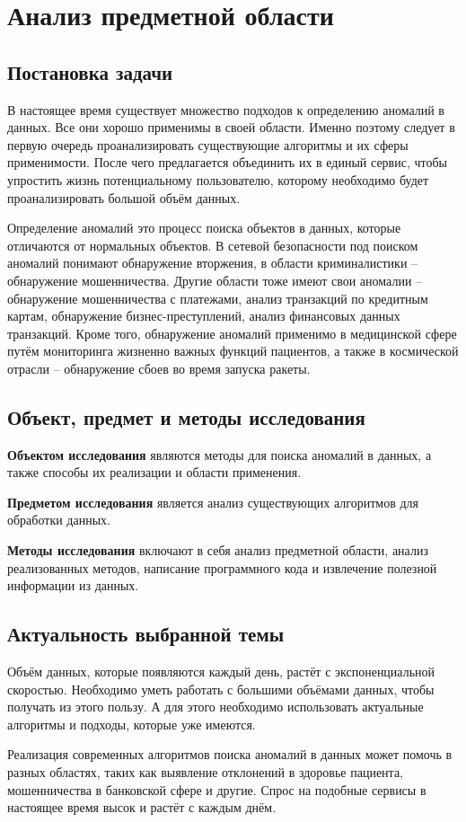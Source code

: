 \chapter{Анализ предметной области} \label{ch:ch1}

\section{Постановка задачи} \label{sec:ch1/sec1}

В настоящее время существует множество подходов к определению аномалий в данных. Все они хорошо применимы в своей области. Именно поэтому следует в первую очередь проанализировать существующие алгоритмы и их сферы применимости. После чего предлагается объединить их в единый сервис, чтобы упростить жизнь потенциальному пользователю, которому необходимо будет проанализировать большой объём данных.

Определение аномалий это процесс поиска объектов в данных, которые отличаются от нормальных объектов. В сетевой безопасности под поиском аномалий понимают обнаружение вторжения, в области криминалистики -- обнаружение мошенничества. Другие области тоже имеют свои аномалии -- обнаружение мошенничества с платежами, анализ транзакций по кредитным картам, обнаружение бизнес-преступлений, анализ финансовых данных транзакций. Кроме того, обнаружение аномалий применимо в медицинской сфере путём мониторинга жизненно важных функций пациентов, а также в космической отрасли -- обнаружение сбоев во время запуска ракеты.

\clearpage

\section{Объект, предмет и методы исследования} \label{sec:ch1/sec2}

\textbf{Объектом исследования} являются методы для поиска аномалий в данных, а также способы их реализации и области применения.

\textbf{Предметом исследования} является анализ существующих алгоритмов для обработки данных.

\textbf{Методы исследования} включают в себя анализ предметной области, анализ реализованных методов, написание программного кода и извлечение полезной информации из данных.

\clearpage

\section{Актуальность выбранной темы} \label{sec:ch1/sec3}

Объём данных, которые появляются каждый день, растёт с экспоненциальной скоростью. Необходимо уметь работать с большими объёмами данных, чтобы получать из этого пользу. А для этого необходимо использовать актуальные алгоритмы и подходы, которые уже имеются.

Реализация современных алгоритмов поиска аномалий в данных может помочь в разных областях, таких как выявление отклонений в здоровье пациента, мошенничества в банковской сфере и другие. Спрос на подобные сервисы в настоящее время высок и растёт с каждым днём.

\clearpage
